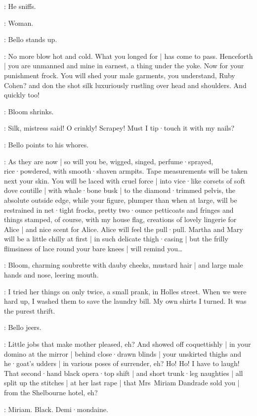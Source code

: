 :
He sniffs.

\Bloom:
Woman.

:
Bello stands up.

\Bello:
No more blow hot and cold.
What you longed for |
has come to pass.
Henceforth |
you are unmanned and mine in earnest,
a thing under the yoke.
Now for your punishment frock.
You will shed your male garments,
you understand,
Ruby Cohen?
and don the shot silk luxuriously rustling over head and shoulders.
And quickly too!

:
Bloom shrinks.

\Bloom:
Silk,
mistress said!
O crinkly!
Scrapey!
Must I tip·touch it with my nails?

:
Bello points to his whores.

\Bello:
As they are now |
so will you be,
wigged,
singed,
perfume·sprayed,
rice·powdered,
with smooth·shaven armpits.
Tape measurements will be taken next your skin.
You will be laced with cruel force |
into vice·like corsets of soft dove coutille |
with whale·bone busk |
to the diamond·trimmed pelvis,
the absolute outside edge,
while your figure,
plumper than when at large,
will be restrained in net·tight frocks,
pretty two·ounce petticoats and fringes and things stamped,
of course,
with my house flag,
%
creations of lovely lingerie for Alice |
and nice scent for Alice.
Alice will feel the pull·pull.
Martha and Mary will be a little chilly at first |
in such delicate thigh·casing |
but the frilly flimsiness of lace round your bare knees |
will remind you…

:
Bloom,
charming soubrette with dauby cheeks,
mustard hair |
and large male hands and nose,
leering mouth.

\Bloom:
I tried her things on only twice,
a small prank,
in Holles street.
When we were hard up,
I washed them to save the laundry bill.
My own shirts I turned.
It was the purest thrift.

:
Bello jeers.

\Bello:
Little jobs that make mother pleased,
eh?
%
And showed off coquettishly |
in your domino at the mirror |
behind close·drawn blinds |
your unskirted thighs and he·goat's udders |
in various poses of surrender,
eh?
Ho!
Ho!
I have to laugh!
That second·hand black opera·top shift |
and short trunk·leg naughties |
all split up the stitches |
at her last rape |
that Mrs~Miriam Dandrade sold you |
from the Shelbourne hotel,
eh?

\Bloom:
Miriam.
Black.
Demi·mondaine.

